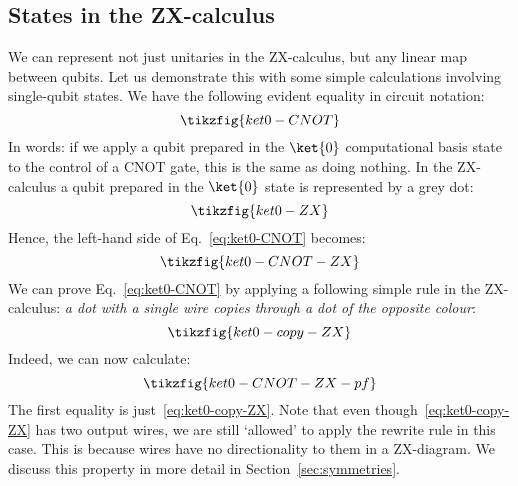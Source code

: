 \documentclass[a4paper,onecolumn,superscriptaddress,11pt,%
				unpublished,%
				allowfontchageintitle,%
				]{quantumarticle}
\begin{document}
\subsection{States in the ZX-calculus}
We can represent not just unitaries in the ZX-calculus, but any linear map between qubits. Let us demonstrate this with some simple calculations involving single-qubit states.
We have the following evident equality in circuit notation:
\begin{equation}\label{eq:ket0-CNOT}
\tikzfig{ket0-CNOT}
\end{equation}
In words: if we apply a qubit prepared in the $\ket{0}$ computational basis state to the control of a CNOT gate, this is the same as doing nothing.
In the ZX-calculus a qubit prepared in the $\ket{0}$ state is represented by a grey dot:
\begin{equation}\label{ket0-ZX}
\tikzfig{ket0-ZX}
\end{equation}
Hence, the left-hand side of Eq.~\eqref{eq:ket0-CNOT} becomes:
\begin{equation}
 \tikzfig{ket0-CNOT-ZX}
\end{equation}
We can prove Eq.~\eqref{eq:ket0-CNOT} by applying a following simple rule in the ZX-calculus: \emph{a dot with a single wire copies through a dot of the opposite colour}:
\begin{equation}\label{eq:ket0-copy-ZX}
	\tikzfig{ket0-copy-ZX}
\end{equation}
Indeed, we can now calculate:
\begin{equation}\label{eq:ket0-copy-proof}
 \tikzfig{ket0-CNOT-ZX-pf}
\end{equation}
The first equality is just~\eqref{eq:ket0-copy-ZX}. Note that even though~\eqref{eq:ket0-copy-ZX} has two output wires, we are still `allowed' to apply the rewrite rule in this case. This is because wires have no directionality to them in a ZX-diagram. We discuss this property in more detail in Section~\ref{sec:symmetries}. 
\end{document}
